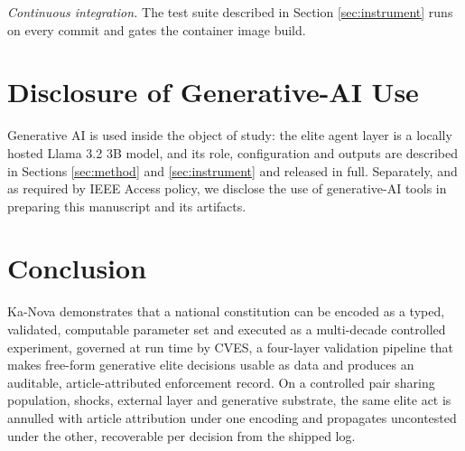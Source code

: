 \documentclass{ieeeaccess}
\newif\ifpendingvisible
\newcommand{\todo}[1]{%
  \ifpendingvisible\textcolor{red}{\textbf{[\MakeUppercase{#1}]}}\fi}
\begin{document}
\emph{Continuous integration.} The test suite described in Section
\ref{sec:instrument} runs on every commit and gates the container image
build.

\section{Disclosure of Generative-AI Use}
\label{sec:aiuse}

\todo{PENDING FACTUAL DETERMINATION BY THE AUTHORS. The paragraph below
is a template with the correct structure and scope. Every factual claim
in it must be confirmed by the author who produced each artifact before
submission, and any statement that is not confirmed must be removed
rather than softened. In particular the figure provenance question,
whether any of the schematic figures were produced or substantially
modified with a generative tool, has not yet been answered by anyone and
the reviewer asked about it explicitly.}

Generative AI is used inside the object of study: the elite agent layer
is a locally hosted Llama 3.2 3B model, and its role, configuration and
outputs are described in Sections \ref{sec:method} and
\ref{sec:instrument} and released in full. Separately, and as required
by IEEE Access policy, we disclose the use of generative-AI tools in
preparing this manuscript and its artifacts.
\todo{PENDING: state, per artifact class, whether a generative tool was
used: (a) the schematic figures, (b) the data figures, (c) manuscript
prose, (d) source code. For each, name the tool and the extent, and
state that the authors reviewed and take full responsibility for the
content. Data figures are regenerated directly from model output by
scripts released with the package.}

\section{Conclusion}
\label{sec:conclusion}

Ka-Nova demonstrates that a national constitution can be encoded as a
typed, validated, computable parameter set and executed as a multi-decade
controlled experiment, governed at run time by CVES, a four-layer
validation pipeline that makes free-form generative elite decisions
usable as data and produces an auditable, article-attributed enforcement
record. On a controlled pair sharing population, shocks, external layer
and generative substrate, the same elite act is annulled with article
attribution under one encoding and propagates uncontested under the
other, recoverable per decision from the shipped log.
\end{document}
